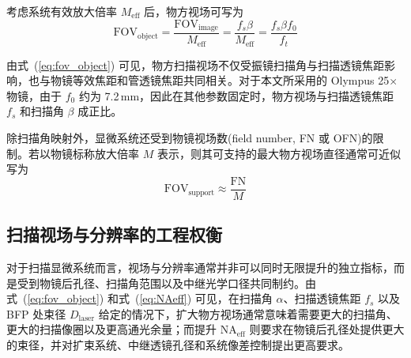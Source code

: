 考虑系统有效放大倍率 $M_{\mathrm{eff}}$ 后，物方视场可写为
\begin{equation}
  \mathrm{FOV}_{\mathrm{object}}
  =\frac{\mathrm{FOV}_{\mathrm{image}}}{M_{\mathrm{eff}}}
  =\frac{f_s\beta}{M_{\mathrm{eff}}}
  =\frac{f_s\beta f_0}{f_t}
  \label{eq:fov_object}
\end{equation}

由式~(\ref{eq:fov_object}) 可见，物方扫描视场不仅受振镜扫描角与扫描透镜焦距影响，也与物镜等效焦距和管透镜焦距共同相关。对于本文所采用的 Olympus 25$\times$ 物镜，由于 $f_0$ 约为 7.2\,mm，因此在其他参数固定时，物方视场与扫描透镜焦距 $f_s$ 和扫描角 $\beta$ 成正比。

除扫描角映射外，显微系统还受到物镜视场数(field number, FN 或 OFN)的限制。若以物镜标称放大倍率 $M$ 表示，则其可支持的最大物方视场直径通常可近似写为
\begin{equation}
  \mathrm{FOV}_{\mathrm{support}}\approx \frac{\mathrm{FN}}{M}
  \label{eq:fov_support}
\end{equation}





\subsection{扫描视场与分辨率的工程权衡}\label{2.4.4}

对于扫描显微系统而言，视场与分辨率通常并非可以同时无限提升的独立指标，而是受到物镜后孔径、扫描角范围以及中继光学口径共同制约。由式~(\ref{eq:fov_object}) 和式~(\ref{eq:NAeff}) 可见，在扫描角 $\alpha$、扫描透镜焦距 $f_s$ 以及 BFP 处束径 $D_{\mathrm{laser}}$ 给定的情况下，扩大物方视场通常意味着需要更大的扫描角、更大的扫描像圈以及更高通光余量；而提升 $\mathrm{NA}_{\mathrm{eff}}$ 则要求在物镜后孔径处提供更大的束径，并对扩束系统、中继透镜孔径和系统像差控制提出更高要求。

